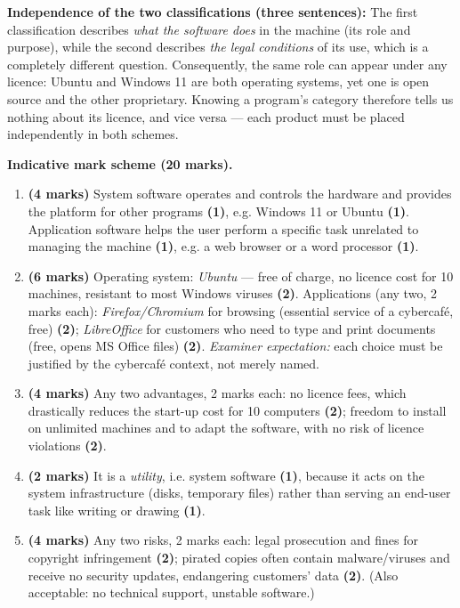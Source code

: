 \documentclass[11pt]{article}
\begin{document}
\begin{corrige}
\textbf{Independence of the two classifications (three sentences):} The first classification describes \emph{what the software does} in the machine (its role and purpose), while the second describes \emph{the legal conditions} of its use, which is a completely different question. Consequently, the same role can appear under any licence: Ubuntu and Windows 11 are both operating systems, yet one is open source and the other proprietary. Knowing a program's category therefore tells us nothing about its licence, and vice versa — each product must be placed independently in both schemes.
\end{corrige}

\begin{corrige}
\textbf{Indicative mark scheme (20 marks).}
\begin{enumerate}
\item \textbf{(4 marks)} System software operates and controls the hardware and provides the platform for other programs \textbf{(1)}, e.g. Windows 11 or Ubuntu \textbf{(1)}. Application software helps the user perform a specific task unrelated to managing the machine \textbf{(1)}, e.g. a web browser or a word processor \textbf{(1)}.
\item \textbf{(6 marks)} Operating system: \emph{Ubuntu} — free of charge, no licence cost for 10 machines, resistant to most Windows viruses \textbf{(2)}. Applications (any two, 2 marks each): \emph{Firefox/Chromium} for browsing (essential service of a cybercafé, free) \textbf{(2)}; \emph{LibreOffice} for customers who need to type and print documents (free, opens MS Office files) \textbf{(2)}. \emph{Examiner expectation:} each choice must be justified by the cybercafé context, not merely named.
\item \textbf{(4 marks)} Any two advantages, 2 marks each: no licence fees, which drastically reduces the start-up cost for 10 computers \textbf{(2)}; freedom to install on unlimited machines and to adapt the software, with no risk of licence violations \textbf{(2)}.
\item \textbf{(2 marks)} It is a \emph{utility}, i.e. system software \textbf{(1)}, because it acts on the system infrastructure (disks, temporary files) rather than serving an end-user task like writing or drawing \textbf{(1)}.
\item \textbf{(4 marks)} Any two risks, 2 marks each: legal prosecution and fines for copyright infringement \textbf{(2)}; pirated copies often contain malware/viruses and receive no security updates, endangering customers' data \textbf{(2)}. (Also acceptable: no technical support, unstable software.)
\end{enumerate}
\end{corrige}
\end{document}
